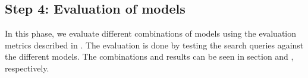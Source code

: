 \subsection*{Step 4: Evaluation of models}
In this phase, we evaluate different combinations of models using the evaluation metrics described in .
The evaluation is done by testing the search queries against the different models. 
The combinations and results can be seen in section  and , respectively.



